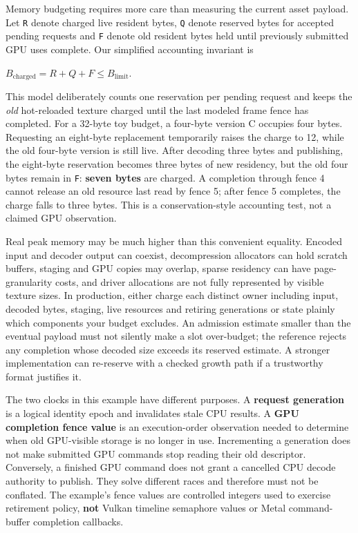 Memory budgeting requires more care than measuring the current asset payload. Let \texttt{R} denote charged live resident bytes, \texttt{Q} denote reserved bytes for accepted pending requests and \texttt{F} denote old resident bytes held until previously submitted GPU uses complete. Our simplified accounting invariant is

\(B_{\mathrm{charged}} = R+Q+F \le B_{\mathrm{limit}}.\)

This model deliberately counts one reservation per pending request and keeps the \emph{old} hot-reloaded texture charged until the last modeled frame fence has completed. For a 32-byte toy budget, a four-byte version C occupies four bytes. Requesting an eight-byte replacement temporarily raises the charge to 12, while the old four-byte version is still live. After decoding three bytes and publishing, the eight-byte reservation becomes three bytes of new residency, but the old four bytes remain in \texttt{F}: \textbf{seven bytes} are charged. A completion through fence 4 cannot release an old resource last read by fence 5; after fence 5 completes, the charge falls to three bytes. This is a conservation-style accounting test, not a claimed GPU observation.

Real peak memory may be much higher than this convenient equality. Encoded input and decoder output can coexist, decompression allocators can hold scratch buffers, staging and GPU copies may overlap, sparse residency can have page-granularity costs, and driver allocations are not fully represented by visible texture sizes. In production, either charge each distinct owner including input, decoded bytes, staging, live resources and retiring generations or state plainly which components your budget excludes. An admission estimate smaller than the eventual payload must not silently make a slot over-budget; the reference rejects any completion whose decoded size exceeds its reserved estimate. A stronger implementation can re-reserve with a checked growth path if a trustworthy format justifies it.

The two clocks in this example have different purposes. A \textbf{request generation} is a logical identity epoch and invalidates stale CPU results. A \textbf{GPU completion fence value} is an execution-order observation needed to determine when old GPU-visible storage is no longer in use. Incrementing a generation does not make submitted GPU commands stop reading their old descriptor. Conversely, a finished GPU command does not grant a cancelled CPU decode authority to publish. They solve different races and therefore must not be conflated. The example's fence values are controlled integers used to exercise retirement policy, \textbf{not} Vulkan timeline semaphore values or Metal command-buffer completion callbacks.


